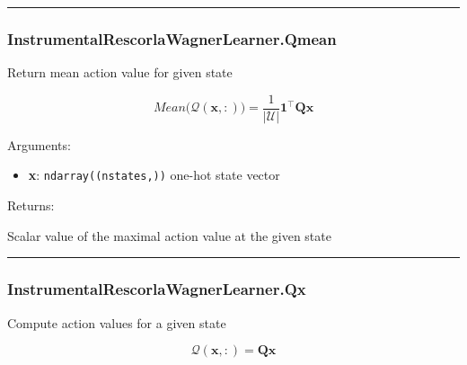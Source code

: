 \begin{center}\rule{0.5\linewidth}{\linethickness}\end{center}

\hypertarget{instrumentalrescorlawagnerlearner.qmean}{%
\subsubsection{InstrumentalRescorlaWagnerLearner.Qmean}\label{instrumentalrescorlawagnerlearner.qmean}}

\begin{Shaded}
\begin{Highlighting}[]
\end{Highlighting}
\end{Shaded}

Return mean action value for given state

\[
Mean \big(\mathcal Q(\mathbf x, :)\big) = \frac{1}{|\mathcal U|} \mathbf 1^\top \mathbf Q \mathbf x
\]

Arguments:

\begin{itemize}
\tightlist
\item
  \textbf{x}: \texttt{ndarray((nstates,))} one-hot state vector
\end{itemize}

Returns:

Scalar value of the maximal action value at the given state

\begin{center}\rule{0.5\linewidth}{\linethickness}\end{center}

\hypertarget{instrumentalrescorlawagnerlearner.qx}{%
\subsubsection{InstrumentalRescorlaWagnerLearner.Qx}\label{instrumentalrescorlawagnerlearner.qx}}

\begin{Shaded}
\begin{Highlighting}[]
\end{Highlighting}
\end{Shaded}

Compute action values for a given state

\[
\mathcal Q(\mathbf x, :) = \mathbf Q \mathbf x
\]

